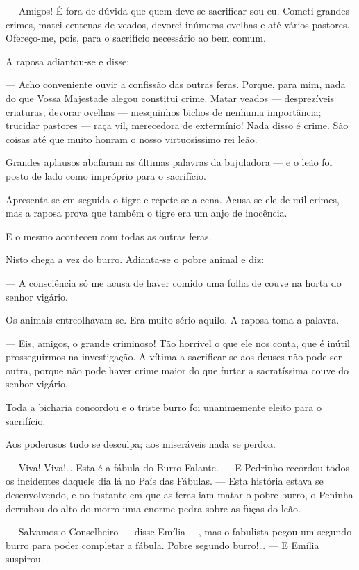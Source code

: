 --- Amigos! É fora de dúvida que quem deve se sacrificar sou eu. Cometi
grandes crimes, matei centenas de veados, devorei inúmeras ovelhas e até
vários pastores. Ofereço-me, pois, para o sacrifício necessário ao bem
comum.

A raposa adiantou-se e disse:

--- Acho conveniente ouvir a confissão das outras feras. Porque, para
mim, nada do que Vossa Majestade alegou constitui crime. Matar veados
--- desprezíveis criaturas; devorar ovelhas --- mesquinhos bichos de
nenhuma importância; trucidar pastores --- raça vil, merecedora de
extermínio! Nada disso é crime. São coisas até que muito honram o nosso
virtuosíssimo rei leão.

Grandes aplausos abafaram as últimas palavras da bajuladora --- e o leão
foi posto de lado como impróprio para o sacrifício.

Apresenta-se em seguida o tigre e repete-se a cena. Acusa-se ele de mil
crimes, mas a raposa prova que também o tigre era um anjo de inocência.

E o mesmo aconteceu com todas as outras feras.

Nisto chega a vez do burro. Adianta-se o pobre animal e diz:

--- A consciência só me acusa de haver comido uma folha de couve na
horta do senhor vigário.

Os animais entreolhavam-se. Era muito sério aquilo. A raposa toma a
palavra.

--- Eis, amigos, o grande criminoso! Tão horrível o que ele nos conta,
que é inútil prosseguirmos na investigação. A vítima a sacrificar-se aos
deuses não pode ser outra, porque não pode haver crime maior do que
furtar a sacratíssima couve do senhor vigário.

Toda a bicharia concordou e o triste burro foi unanimemente eleito para
o sacrifício.

Aos poderosos tudo se desculpa; aos miseráveis nada se perdoa.

--- Viva! Viva!\ldots{} Esta é a fábula do Burro Falante. --- E Pedrinho
recordou todos os incidentes daquele dia lá no País das Fábulas. ---
Esta história estava se desenvolvendo, e no instante em que as feras iam
matar o pobre burro, o Peninha derrubou do alto do morro uma enorme
pedra sobre as fuças do leão.

--- Salvamos o Conselheiro --- disse Emília ---, mas o fabulista pegou
um segundo burro para poder completar a fábula. Pobre segundo
burro!\ldots{} --- E Emília suspirou.


